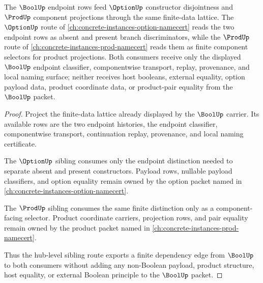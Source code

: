 \begin{theorem}
\label{thm:bool-finite-data-hub-sibling-route}
The $\BoolUp$ endpoint rows feed $\OptionUp$ constructor disjointness and $\ProdUp$ component projections through the same finite-data lattice. The $\OptionUp$ route of \autoref{ch:concrete-instances-option-namecert} reads the two endpoint rows as absent and present branch discriminators, while the $\ProdUp$ route of \autoref{ch:concrete-instances-prod-namecert} reads them as finite component selectors for product projections. Both consumers receive only the displayed $\BoolUp$ endpoint classifier, componentwise transport, replay, provenance, and local naming surface; neither receives host booleans, external equality, option payload data, product coordinate data, or product-pair equality from the $\BoolUp$ packet.
\end{theorem}
\begin{proof}
Project the finite-data lattice already displayed by the $\BoolUp$ carrier. Its available rows are the two endpoint histories, the endpoint classifier, componentwise transport, continuation replay, provenance, and local naming certificate.

The $\OptionUp$ sibling consumes only the endpoint distinction needed to separate absent and present constructors. Payload rows, nullable payload classifiers, and option equality remain owned by the option packet named in \autoref{ch:concrete-instances-option-namecert}.

The $\ProdUp$ sibling consumes the same finite distinction only as a component-facing selector. Product coordinate carriers, projection rows, and pair equality remain owned by the product packet named in \autoref{ch:concrete-instances-prod-namecert}.

Thus the hub-level sibling route exports a finite dependency edge from $\BoolUp$ to both consumers without adding any non-Boolean payload, product structure, host equality, or external Boolean principle to the $\BoolUp$ packet.
\end{proof}
